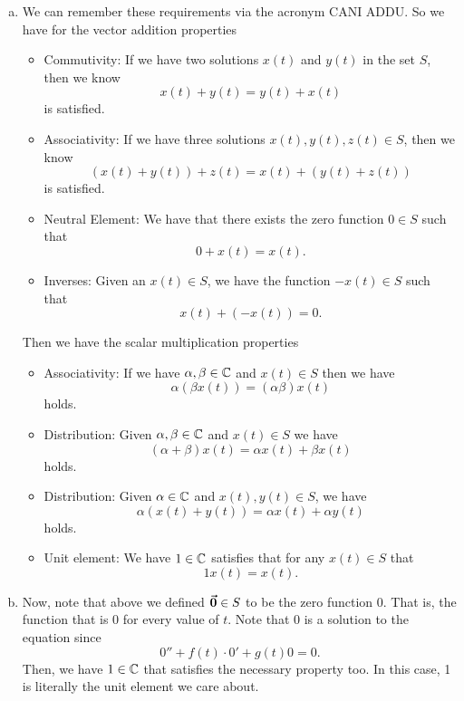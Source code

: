 \documentclass[12pt]{article} %
\begin{document}
\begin{solution}
\begin{enumerate}[(a)]
    \item We can remember these requirements via the acronym CANI ADDU.  So we have for the vector addition properties
    \begin{itemize}
        \item Commutivity: If we have two solutions $x(t)$ and $y(t)$ in the set $S$, then we know 
        \[
        x(t)+y(t)=y(t)+x(t)
        \]
        is satisfied.
        \item Associativity: If we have three solutions $x(t),y(t),z(t)\in S$, then we know
        \[
        (x(t)+y(t))+z(t)=x(t) + (y(t)+z(t))
        \]
        is satisfied.
        \item Neutral Element: We have that there exists the zero function $0\in S$ such that
        \[
        0+x(t)=x(t).
        \]
        \item Inverses: Given an $x(t)\in S$, we have the function $-x(t)\in S$ such that
        \[
        x(t)+(-x(t))=0.
        \]
    \end{itemize}
    Then we have the scalar multiplication properties
    \begin{itemize}
        \item Associativity: If we have $\alpha,\beta \in \mathbb{C}$ and $x(t)\in S$ then we have
        \[
        \alpha (\beta x(t)) = (\alpha \beta)x(t)
        \]
        holds.
        \item Distribution: Given $\alpha,\beta \in \mathbb{C}$ and $x(t)\in S$ we have
        \[
        (\alpha +\beta)x(t) = \alpha x(t) + \beta x(t)
        \]
        holds.
        \item Distribution: Given $\alpha\in \mathbb{C}$ and $x(t),y(t)\in S$, we have
        \[
        \alpha(x(t)+y(t))=\alpha x(t) + \alpha y(t)
        \]
        holds.
        \item Unit element: We have $1\in \mathbb{C}$ satisfies that for any $x(t)\in S$ that
        \[
        1 x(t) = x(t).
        \]
    \end{itemize}
    \item Now, note that above we defined $\boldsymbol{\vec{0}}\in S$ to be the zero function 0. That is, the function that is 0 for every value of $t$. Note that $0$ is a solution to the equation since
    \[
    0'' + f(t)\cdot 0' + g(t) 0 = 0.
    \]
    Then, we have $1\in \mathbb{C}$ that satisfies the necessary property too. In this case, 1 is literally the unit element we care about.  
    

\end{enumerate}
\end{solution}
\end{document}
